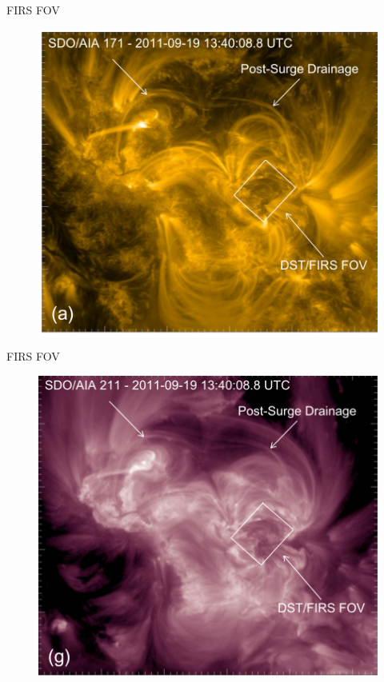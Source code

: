 \documentclass{beamer}
\begin{document}
\begin{frame}{FIRS FOV}

 
\begin{figure}[H]
 \centering
 \includegraphics[scale=0.5]{img1.png}
\end{figure}



\end{frame}

\begin{frame}{FIRS FOV}

 
\begin{figure}[H]
 \centering
 \includegraphics[scale=0.5]{img2.png}
\end{figure}



\end{frame}
\end{document}
